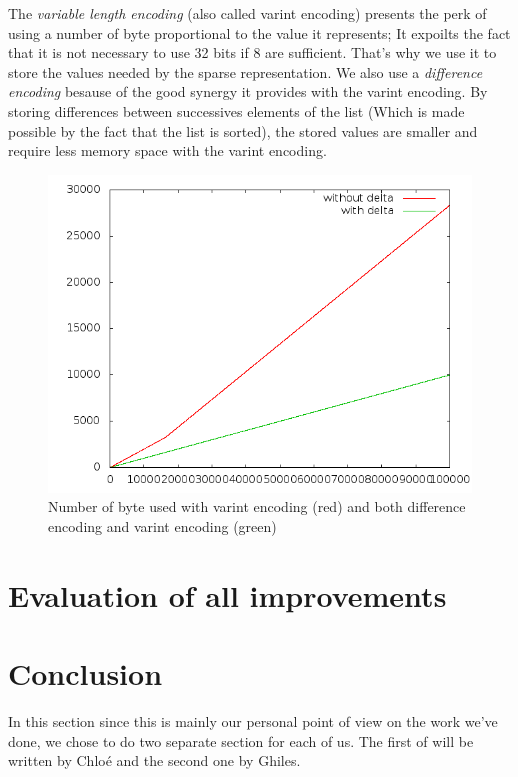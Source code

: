 \documentclass{article}
\begin{document}
The \emph{variable length encoding} (also called varint encoding) presents the perk of using a number of byte
proportional to the value it represents; It expoilts the fact that it is not necessary to use 32 bits if 8 are
sufficient. That's why we use it to store the values needed by the sparse representation.
We also use a \emph{difference encoding} besause of the good synergy it provides with the varint encoding.
By storing differences between successives elements of the list (Which is made possible by the fact that the list 
is sorted), the stored values are smaller and require less memory space with the varint encoding.

\begin{center}
\begin{figure}[!htb]
\includegraphics[scale=0.5]{img03.png}
\caption{Number of byte used with varint encoding (red) and both difference encoding and varint encoding (green)}
\end{figure}
\end{center}


\section{Evaluation of all improvements}

\section{Conclusion}

In this section since this is mainly our personal point of view on the work we've done, we chose to do two separate section for each of us. The first of will be written by Chlo\'e and the second one by Ghiles.
\end{document}
